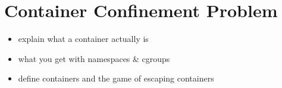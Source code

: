 \section{Container Confinement Problem}
\label{sec:confinement}

\begin{itemize}
   \item explain what a container actually is
   \item what you get with namespaces \& cgroups
   \item define containers and the game of escaping containers
\end{itemize}
